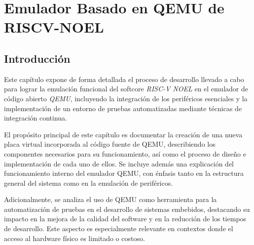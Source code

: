 %
%
%
% 
%
%
%
%

\chapter{Emulador Basado en QEMU de RISCV-NOEL}
\label{cha:desarrollo}

\section{Introducción}
\label{sec:introduccion-desarrollo}

Este capítulo expone de forma detallada el proceso de desarrollo llevado a cabo para lograr la emulación funcional del softcore \textit{RISC-V NOEL} en el emulador de código abierto \textit{QEMU}, incluyendo la integración de los periféricos esenciales y la implementación de un entorno de pruebas automatizadas mediante técnicas de integración continua.

El propósito principal de este capítulo es documentar la creación de una nueva placa virtual incorporada al código fuente de QEMU, describiendo los componentes necesarios para su funcionamiento, así como el proceso de diseño e implementación de cada uno de ellos. Se incluye además una explicación del funcionamiento interno del emulador QEMU, con énfasis tanto en la estructura general del sistema como en la emulación de periféricos.

Adicionalmente, se analiza el uso de QEMU como herramienta para la automatización de pruebas en el desarrollo de sistemas embebidos, destacando su impacto en la mejora de la calidad del software y en la reducción de los tiempos de desarrollo. Este aspecto es especialmente relevante en contextos donde el acceso al hardware físico es limitado o costoso.

